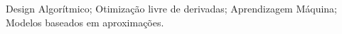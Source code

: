 \noindent Design Algorítmico; Otimização livre de derivadas; Aprendizagem Máquina; Modelos baseados em aproximações.